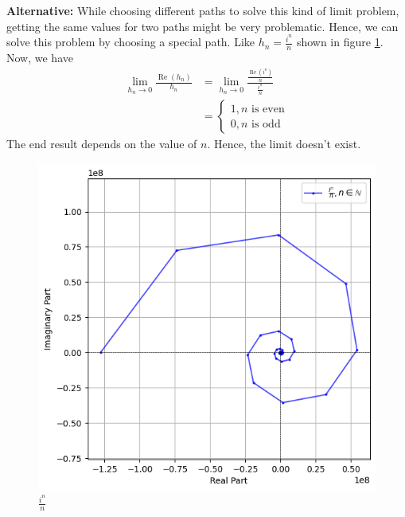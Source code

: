 \begin{example}
    \textbf{Alternative:} While choosing different paths to solve this kind of limit problem, getting the same values for two paths might be very problematic. Hence, we can solve this problem by choosing a special path. Like $h_n=\frac{i^n}{n}$ shown in figure \ref{fig:Re_z_diff}. Now, we have
    \begin{align*}
        \lim_{h_n\rightarrow0} \frac{\operatorname{Re}(h_n)}{h_n} &= \lim_{h_n\rightarrow0} \frac{\frac{\operatorname{Re}(i^n)}{n}}{\frac{i^n}{n}}\\
        &= \begin{cases}
            1,n\text{ is even}\\
            0,n\text{ is odd}
        \end{cases}
    \end{align*}
    The end result depends on the value of $n$. Hence, the limit doesn't exist. 
\end{example}
\begin{figure}
        \centering
        \includegraphics[width=0.5\linewidth]{FIG_MAT215/Re_z.png}
        \caption{$\frac{i^n}{n}$}
        \label{fig:Re_z_diff}
    \end{figure}
